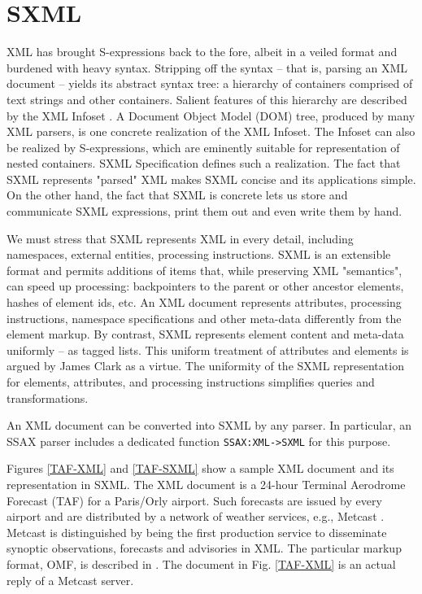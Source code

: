 \documentclass[10pt]{llncs}
\begin{document}
\section{SXML}
XML has brought S-expressions back to the fore, albeit in a
veiled format and burdened with heavy syntax. Stripping off the syntax
-- that is, parsing an XML document -- yields its abstract syntax
tree: a hierarchy of containers comprised of text strings and other
containers. Salient features of this hierarchy are described by the
XML Infoset \cite{XML-Infoset}. A Document Object Model (DOM)
tree, produced by many XML parsers, is one concrete realization of the
XML Infoset. The Infoset can also be realized by S-expressions, which
are eminently suitable for representation of nested containers. SXML
Specification \cite{SXML} defines such a realization. The fact
that SXML represents "parsed" XML makes SXML concise and its
applications simple. On the other hand, the fact that SXML is concrete
lets us store and communicate SXML expressions, print them out and
even write them by hand.

We must stress that SXML represents XML in every detail, including
namespaces, external entities, processing instructions. SXML is an
extensible format and permits additions of items that, while
preserving XML "semantics", can speed up processing: backpointers to
the parent or other ancestor elements, hashes of element ids,
etc. An XML document represents attributes, processing instructions,
namespace specifications and other meta-data differently from the
element markup. By contrast, SXML represents element content and
meta-data uniformly -- as tagged lists. This uniform treatment of
attributes and elements is argued by James Clark \cite{RNG-Design} as a virtue.  The uniformity of the SXML representation for
elements, attributes, and processing instructions simplifies queries
and transformations.

An XML document can be converted into SXML by any parser.  In
particular, an SSAX parser \cite{SSAX-paper} includes a dedicated
function \texttt{SSAX:XML->SXML} for this purpose.

Figures \ref{TAF-XML} and \ref{TAF-SXML} show a
sample XML document and its representation in SXML. The XML document
is a 24-hour Terminal Aerodrome Forecast (TAF) for a Paris/Orly
airport. Such forecasts are issued by every airport and are distributed by
a network of weather services, e.g., Metcast \cite{Metcast}. Metcast is distinguished by being the first production service to
disseminate synoptic observations, forecasts and advisories in
XML. The particular markup format, OMF, is described in
\cite{OMF}. The document in Fig. \ref{TAF-XML} is an
actual reply of a Metcast server.
\end{document}
